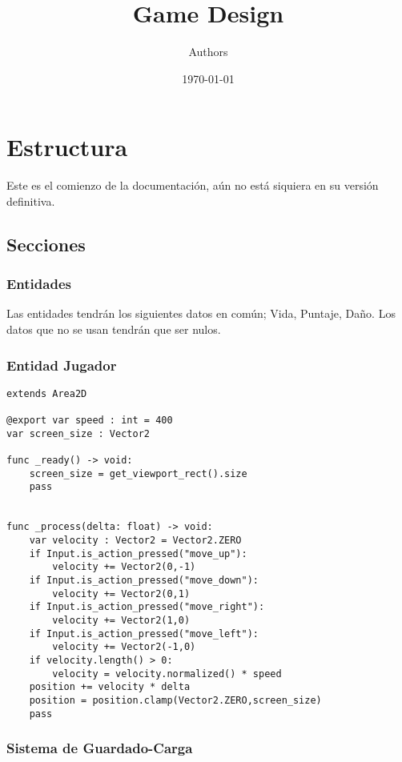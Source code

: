 \documentclass{article}
\title{Game Design}
\author{Authors}
\date{\today}
\begin{document}
\maketitle
\section*{Estructura}

Este es el comienzo de la documentación, aún no está siquiera en su versión definitiva.

\subsection*{Secciones}

\subsubsection*{Entidades}

Las entidades tendrán los siguientes datos en común; Vida, Puntaje, Daño.
Los datos que no se usan tendrán que ser nulos.

\subsubsection*{Entidad Jugador}

\begin{verbatim}
extends Area2D

@export var speed : int = 400
var screen_size : Vector2

func _ready() -> void:
	screen_size = get_viewport_rect().size
	pass


func _process(delta: float) -> void:
	var velocity : Vector2 = Vector2.ZERO
	if Input.is_action_pressed("move_up"):
		velocity += Vector2(0,-1)
	if Input.is_action_pressed("move_down"):
		velocity += Vector2(0,1)
	if Input.is_action_pressed("move_right"):
		velocity += Vector2(1,0)
	if Input.is_action_pressed("move_left"):
		velocity += Vector2(-1,0)
	if velocity.length() > 0:
		velocity = velocity.normalized() * speed
	position += velocity * delta
	position = position.clamp(Vector2.ZERO,screen_size)
	pass
\end{verbatim}



\subsubsection*{Sistema de Guardado-Carga}
\end{document}
